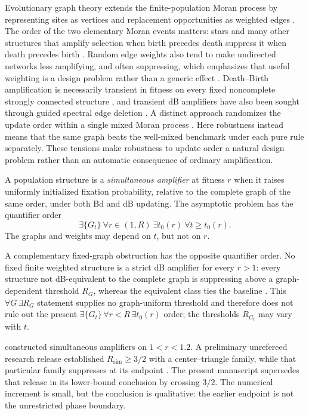 \documentclass[11pt]{article}
\theoremstyle{definition}
\theoremstyle{remark}
\newcommand{\Rsim}{R_{\mathrm{sim}}}
\begin{document}
Evolutionary graph theory extends the finite-population Moran process by
representing sites as vertices and replacement opportunities as weighted
edges \citep{Moran1958,Lieberman2005,Allen2017}.  The order of the two elementary Moran events matters:
stars and many other structures that amplify selection when birth precedes
death suppress it when death precedes birth
\citep{Hindersin2015,Allen2020}.  Random edge weights also tend to make
undirected networks less amplifying, and often suppressing, which emphasizes
that useful weighting is a design problem rather than a generic effect
\citep{Bhaumik2024}.  Death--Birth amplification is necessarily
transient in fitness on every fixed noncomplete strongly connected structure
\citep{Tkadlec2020}, and transient dB amplifiers have also been sought through
guided spectral edge deletion \citep{Richter2023}.  A distinct approach
randomizes the update order within a single mixed Moran process
\citep{Brewster2026}.  Here robustness instead means that the same graph
beats the well-mixed benchmark under each pure rule separately.  These
tensions make robustness to update order a natural design problem rather
than an automatic consequence of ordinary amplification.

A population structure is a \emph{simultaneous amplifier} at fitness $r$
when it raises uniformly initialized fixation probability, relative to the
complete graph of the same order, under both Bd and dB updating.  The
asymptotic problem has the quantifier order
\[
 \exists\{G_t\}\ \forall r\in(1,R)\ \exists t_0(r)\
 \forall t\geq t_0(r).
\]
The graphs and weights may depend on $t$, but not on $r$.

A complementary fixed-graph obstruction has the opposite quantifier order.
No fixed finite weighted structure is a strict dB amplifier for every
$r>1$: every structure not dB-equivalent to the complete graph is suppressing
above a graph-dependent threshold $R_G$, whereas the equivalent class ties
the baseline \citep{Kriebel2026fixed}.  This
$\forall G\,\exists R_G$ statement supplies no graph-uniform threshold and
therefore does not rule out the present
$\exists\{G_t\}\,\forall r<R\,\exists t_0(r)$ order; the thresholds
$R_{G_t}$ may vary with $t$.

\citet{Svoboda2024} constructed simultaneous amplifiers on $1<r<1.2$.
A preliminary unrefereed research release established $\Rsim\geq3/2$ with a
center--triangle family, while that particular family suppresses at its
endpoint \citep{Kriebel2026half}.  The present manuscript supersedes that
release in its lower-bound conclusion by crossing $3/2$.
The numerical increment is small, but the conclusion is qualitative: the
earlier endpoint is not the unrestricted phase boundary.
\end{document}
